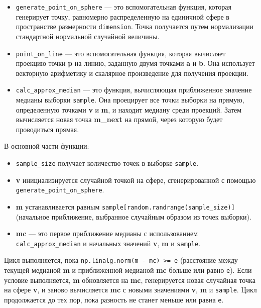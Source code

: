 \documentclass[specialist,
substylefile = spbu.rtx,
               subf,href,colorlinks=true, 12pt]{disser}
\begin{document}
\begin{itemize}
\item \texttt{generate_point_on_sphere} --- это вспомогательная функция, которая генерирует точку, равномерно распределенную на единичной сфере в пространстве размерности \texttt{dimension}. Точка получается путем нормализации стандартной нормальной случайной величины. 

\item\texttt{point_on_line} --- это вспомогательная функция, которая вычисляет проекцию точки \textbf{p} на линию, заданную двумя точками \textbf{a} и \textbf{b}. Она использует векторную арифметику и скалярное произведение для получения проекции.

\item\texttt{calc_approx_median} --- это функция, вычисляющая приближенное значение медианы выборки \texttt{sample}. Она проецирует все точки выборки на прямую, определенную точками \textbf{v} и \textbf{m}, и находит медиану среди проекций. Затем вычисляется новая точка \textbf{m_next} на прямой, через которую будет проводиться прямая.
\end{itemize}

В основной части функции:
\begin{itemize}
\item\texttt{sample_size} получает количество точек в выборке \texttt{sample}.
\item\textbf{v} инициализируется случайной точкой на сфере, сгенерированной с помощью \texttt{generate_point_on_sphere}.
\item\textbf{m} устанавливается равным \texttt{sample[random.randrange(sample_size)] } (начальное приближение, выбранное случайным образом из точек выборки).
\item \textbf{mc} --- это первое приближение медианы с использованием \texttt{calc_approx_median} и начальных значений \textbf{v}, \textbf{m} и \texttt{sample}.
\end{itemize}

Цикл выполняется, пока \texttt{np.linalg.norm(m - mc) >= e} (расстояние между текущей медианой \textbf{m} и приближенной медианой \textbf{mc} больше или равно \texttt{e}). Если условие выполняется, \textbf{m} обновляется на \textbf{mc}, генерируется новая случайная точка на сфере \textbf{v}, и заново вычисляется \textbf{mc} с новыми значениями \textbf{v}, \textbf{m} и \texttt{sample}. Цикл продолжается до тех пор, пока разность не станет меньше или равна \texttt{e}.
\vspace{-1ex}
\end{document}
